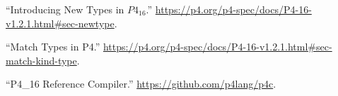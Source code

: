 \documentclass[11pt]{article}
\begin{document}
{{\begin{thebibliography}{44}
\mdbibitemlabel{{}[12]}\textquotedblleft{}Introducing New Types in $P4_{16}$.\textquotedblright{} \href{https://p4.org/p4-spec/docs/P4-16-v1.2.1.html\%23sec-newtype}{{\ttfamily https://\hspace{0pt}p4.\hspace{0pt}org/\hspace{0pt}p4-\hspace{0pt}spec/\hspace{0pt}docs/\hspace{0pt}P4-\hspace{0pt}16-\hspace{0pt}v1.\hspace{0pt}2.\hspace{0pt}1.\hspace{0pt}html\#\hspace{0pt}sec-\hspace{0pt}newtype}}.\label{p4newtypes}%

\mdbibitemlabel{{}[13]}\textquotedblleft{}Match Types in P4.\textquotedblright{} \href{https://p4.org/p4-spec/docs/P4-16-v1.2.1.html\%23sec-match-kind-type}{{\ttfamily https://\hspace{0pt}p4.\hspace{0pt}org/\hspace{0pt}p4-\hspace{0pt}spec/\hspace{0pt}docs/\hspace{0pt}P4-\hspace{0pt}16-\hspace{0pt}v1.\hspace{0pt}2.\hspace{0pt}1.\hspace{0pt}html\#\hspace{0pt}sec-\hspace{0pt}match-\hspace{0pt}kind-\hspace{0pt}type}}.\label{p4matchtypes}%

\mdbibitemlabel{{}[14]}\textquotedblleft{}P4\_16 Reference Compiler.\textquotedblright{} \href{https://github.com/p4lang/p4c}{{\ttfamily https://\hspace{0pt}github.\hspace{0pt}com/\hspace{0pt}p4lang/\hspace{0pt}p4c}}.\label{p4c}%


\end{thebibliography}}}
\end{document}
